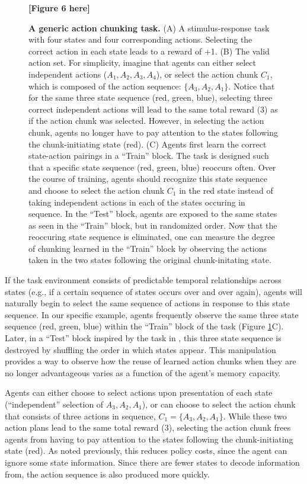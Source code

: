 \documentclass[11pt]{article}
\begin{document}
\begin{figure}
    \centering
    \textbf{[Figure 6 here]}
    \caption{\textbf{A generic action chunking task.} (A) A stimulus-response task with four states and four corresponding actions. Selecting the correct action in each state leads to a reward of +1. (B) The valid action set. For simplicity, imagine that agents can either select independent actions ($A_1, A_2, A_3, A_4$), or select the action chunk $C_1$, which is composed of the action sequence: $\{A_3,A_2,A_1\}$. Notice that for the same three state sequence (red, green, blue), selecting three correct independent actions will lead to the same total reward (3) as if the action chunk was selected. However, in selecting the action chunk, agents no longer have to pay attention to the states following the chunk-initiating state (red). (C) Agents first learn the correct state-action pairings in a ``Train'' block. The task is designed such that a specific state sequence (red, green, blue) reoccurs often. Over the course of training, agents should recognize this state sequence and choose to select the action chunk $C_1$ in the red state instead of taking independent actions in each of the states occuring in sequence. In the ``Test'' block, agents are exposed to the same states as seen in the ``Train'' block, but in randomized order. Now that the reoccuring state sequence is eliminated, one can measure the degree of chunking learned in the ``Train'' block by observing the actions taken in the two states following the original chunk-initating state.}
    \label{fig:ac1}
\end{figure}

If the task environment consists of predictable temporal relationships across states (e.g., if a certain sequence of states occurs over and over again), agents will naturally begin to select the same sequence of actions in response to this state sequence. In our specific example, agents frequently observe the same three state sequence (red, green, blue) within the ``Train'' block of the task (Figure \ref{fig:ac1}C). Later, in a ``Test'' block inspired by the task in \cite{sakai03}, this three state sequence is destroyed by shuffling the order in which states appear. This manipulation provides a way to observe how the reuse of learned action chunks when they are no longer advantageous varies as a function of the agent's memory capacity.

Agents can either choose to select actions upon presentation of each state (``independent'' selection of $A_3,A_2,A_1$), or can choose to select the action chunk that consists of three actions in sequence, $C_1 = \{A_3,A_2,A_1\}$. While these two action plans lead to the same total reward (3), selecting the action chunk frees agents from having to pay attention to the states following the chunk-initiating state (red). As noted previously, this reduces policy costs, since the agent can ignore some state information. Since there are fewer states to decode information from, the action sequence is also produced more quickly.
\end{document}
